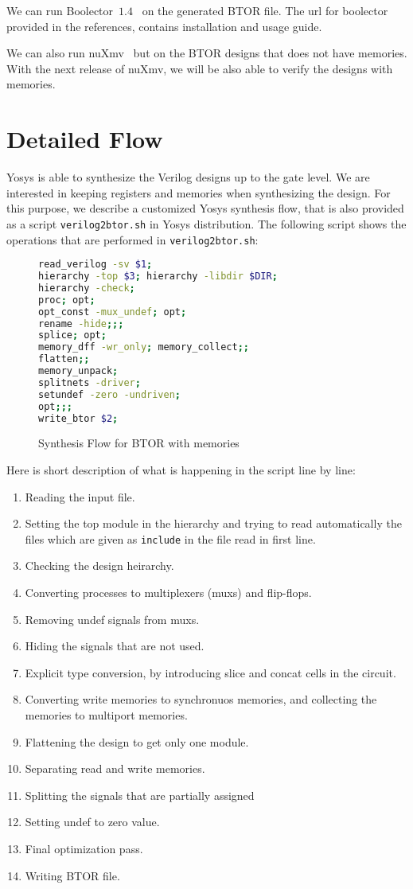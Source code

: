 \documentclass[9pt,technote,a4paper]{IEEEtran}
\begin{document}
We can run Boolector~$1.4$~\cite{boolector} on the generated BTOR
file.  The url for boolector provided in the references, contains
installation and usage guide.

We can also run nuXmv~\cite{nuxmv} but on the BTOR designs that does
not have memories. With the next release of nuXmv, we will be also
able to verify the designs with memories.

\section{Detailed Flow}

Yosys is able to synthesize the Verilog designs up to the gate level.
We are interested in keeping registers and memories when synthesizing
the design. For this purpose, we describe a customized Yosys synthesis
flow, that is also provided as a script {\tt verilog2btor.sh} in Yosys
distribution. The following script shows the operations that are
performed in {\tt verilog2btor.sh}:

\begin{figure}[H]
\begin{lstlisting}[language=sh]
read_verilog -sv $1; 
hierarchy -top $3; hierarchy -libdir $DIR; 
hierarchy -check; 
proc; opt; 
opt_const -mux_undef; opt;
rename -hide;;;
splice; opt;
memory_dff -wr_only; memory_collect;;
flatten;;
memory_unpack; 
splitnets -driver;
setundef -zero -undriven;
opt;;;
write_btor $2;
\end{lstlisting}
 \renewcommand{\figurename}{Listing}
\caption{Synthesis Flow for BTOR with memories}
\label{btor_script_memory}
\end{figure}

Here is short description of what is happening in the script line by
line:

\begin{enumerate}
\item Reading the input file.
\item Setting the top module in the hierarchy and trying to read
  automatically the files which are given as {\tt include} in the file
  read in first line.
\item Checking the design heirarchy.
\item Converting processes to multiplexers (muxs) and flip-flops.
\item Removing undef signals from muxs.
\item Hiding the signals that are not used.
\item Explicit type conversion, by introducing slice and concat cells
  in the circuit.
\item Converting write memories to synchronuos memories, and
  collecting the memories to multiport memories.
\item Flattening the design to get only one module.
\item Separating read and write memories.
\item Splitting the signals that are partially assigned 
\item Setting undef to zero value.
\item Final optimization pass.
\item Writing BTOR file.
\end{enumerate}
\end{document}
